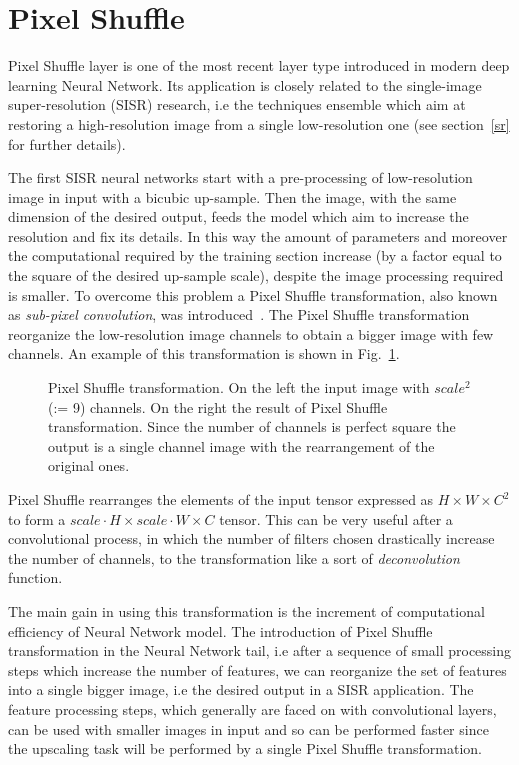 \documentclass{standalone}
\begin{document}
\section[Pixel Shuffle]{Pixel Shuffle}\label{shuffler}

Pixel Shuffle layer is one of the most recent layer type introduced in modern deep learning Neural Network.
Its application is closely related to the single-image super-resolution (SISR) research, i.e the techniques ensemble which aim at restoring a high-resolution image from a single low-resolution one (see section~\ref{sr} for further details).

The first SISR neural networks start with a pre-processing of low-resolution image in input with a bicubic up-sample.
Then the image, with the same dimension of the desired output, feeds the model which aim to increase the resolution and fix its details.
In this way the amount of parameters and moreover the computational required by the training section increase (by a factor equal to the square of the desired up-sample scale), despite the image processing required is smaller.
To overcome this problem a Pixel Shuffle transformation, also known as \emph{sub-pixel convolution}, was introduced~\cite{Wenzhe2016Shuffle}.
The Pixel Shuffle transformation reorganize the low-resolution image channels to obtain a bigger image with few channels.
An example of this transformation is shown in Fig.~\ref{fig:pixel_shuffle}.

\begin{figure}[htbp]
\centering
\def\svgwidth{0.4\textwidth}

\caption{Pixel Shuffle transformation.
On the left the input image with $scale^2$ (:= 9) channels.
On the right the result of Pixel Shuffle transformation.
Since the number of channels is perfect square the output is a single channel image with the rearrangement of the original ones.
}
\label{fig:pixel_shuffle}
\end{figure}

Pixel Shuffle rearranges the elements of the input tensor expressed as $H \times W \times C^2$ to form a $scale \cdot H \times scale \cdot W \times C$ tensor.
This can be very useful after a convolutional process, in which the number of filters chosen drastically increase the number of channels, to  the transformation like a sort of \emph{deconvolution} function.

The main gain in using this transformation is the increment of computational efficiency of Neural Network model.
The introduction of Pixel Shuffle transformation in the Neural Network tail, i.e after a sequence of small processing steps which increase the number of features, we can reorganize the set of features into a single bigger image, i.e the desired output in a SISR application.
The feature processing steps, which generally are faced on with convolutional layers, can be used with smaller images in input and so can be performed faster since the upscaling task will be performed by a single Pixel Shuffle transformation.
\end{document}
